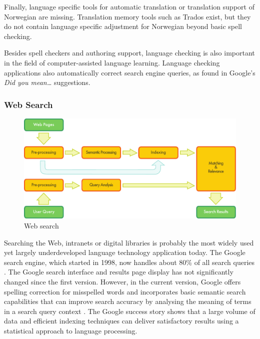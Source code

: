 \begin{multicols}{2}
Finally, language specific tools for automatic translation or translation support of Norwegian are missing. Translation memory tools such as Trados exist, but they do not contain language specific adjustment for Norwegian beyond basic spell checking.

Besides spell checkers and authoring support, language checking is also important in the field of computer-assisted language learning. Language checking applications also automatically correct search engine queries, as found in Google's \textit{Did you mean…} suggestions.

\subsubsection{Web Search}

\begin{figure}[htb]
  \center
  \includegraphics[width=\textwidth]{../_media/english/web_search_architecture}
  \caption{Web search}
\label{fig:websearcharch_en}
 \end{figure}

Searching the Web, intranets or digital libraries is probably the most widely used yet largely underdeveloped language technology application today. The Google search engine, which started in 1998, now handles about 80\% of all search queries \cite{spi1}. 
The Google search interface and results page display has not significantly changed since the first version. However, in the current version, Google offers spelling correction for misspelled words and incorporates basic semantic search capabilities that can improve search accuracy by analysing the meaning of terms in a search query context \cite{pc1}. The Google success story shows that a large volume of data and efficient indexing techniques can deliver satisfactory results using a statistical approach to language processing. 


\end{multicols}
